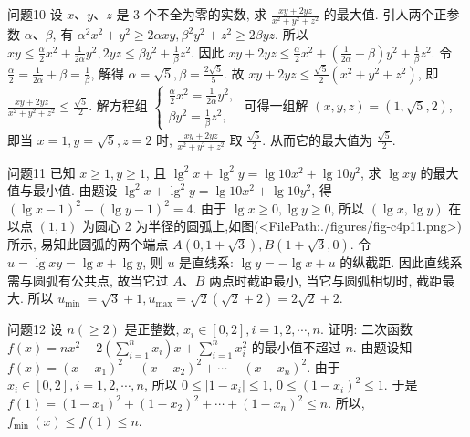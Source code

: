 问题10 设 $x 、 y 、 z$ 是 3 个不全为零的实数, 求 $\frac{x y+2 y z}{x^2+y^2+z^2}$ 的最大值.
引人两个正参数 $\alpha 、 \beta$, 有 $\alpha^2 x^2+y^2 \geqslant 2 \alpha x y, \beta^2 y^2+z^2 \geqslant 2 \beta y z$. 所以 $x y \leqslant \frac{\alpha}{2} x^2+\frac{1}{2 \alpha} y^2, 2 y z \leqslant \beta y^2+\frac{1}{\beta} z^2$. 因此 $x y+2 y z \leqslant \frac{\alpha}{2} x^2+\left(\frac{1}{2 \alpha}+\beta\right) y^2+ \frac{1}{\beta} z^2$. 令 $\frac{\alpha}{2}=\frac{1}{2 \alpha}+\beta=\frac{1}{\beta}$, 解得 $\alpha=\sqrt{5}, \beta=\frac{2 \sqrt{5}}{5}$. 故 $x y+2 y z \leqslant \frac{\sqrt{5}}{2}\left(x^2+\right. \left.y^2+z^2\right)$, 即 $\frac{x y+2 y z}{x^2+y^2+z^2} \leqslant \frac{\sqrt{5}}{2}$. 解方程组 $\left\{\begin{array}{l}\frac{\alpha}{2} x^2=\frac{1}{2 \alpha} y^2, \\ \beta y^2=\frac{1}{\beta} z^2,\end{array}\right.$ 可得一组解 $(x, y, z)=(1, \sqrt{5}, 2)$, 即当 $x=1, y=\sqrt{5}, z=2$ 时, $\frac{x y+2 y z}{x^2+y^2+z^2}$ 取 $\frac{\sqrt{5}}{2}$. 从而它的最大值为 $\frac{\sqrt{5}}{2}$.



问题11 已知 $x \geqslant 1, y \geqslant 1$, 且 $\lg ^2 x+\lg ^2 y=\lg 10 x^2+\lg 10 y^2$, 求 $\lg x y$ 的最大值与最小值.
由题设 $\lg ^2 x+\lg ^2 y=\lg 10 x^2+\lg 10 y^2$, 得 $(\lg x-1)^2+(\lg y-1)^2= 4$. 由于 $\lg x \geqslant 0, \lg y \geqslant 0$, 所以 $(\lg x, \lg y)$ 在以点 $(1,1)$ 为圆心 2 为半径的圆弧上,如图(<FilePath:./figures/fig-c4p11.png>)所示, 易知此圆弧的两个端点 $A(0,1+\sqrt{3}), B(1+\sqrt{3}, 0)$. 令 $u=\lg x y=\lg x+\lg y$, 则 $u$ 是直线系: $\lg y=-\lg x+u$ 的纵截距.
因此直线系需与圆弧有公共点, 故当它过 $A 、 B$ 两点时截距最小, 当它与圆弧相切时, 截距最大.
所以 $u_{\text {min }}= \sqrt{3}+1, u_{\max }=\sqrt{2}(\sqrt{2}+2)=2 \sqrt{2}+2$.



问题12 设 $n(\geqslant 2)$ 是正整数, $x_i \in[0,2], i=1,2, \cdots, n$. 证明: 二次函数 $f(x)=n x^2-2\left(\sum_{i=1}^n x_i\right) x+\sum_{i=1}^n x_i^2$ 的最小值不超过 $n$.
由题设知 $f(x)=\left(x-x_1\right)^2+\left(x-x_2\right)^2+\cdots+\left(x-x_n\right)^2$. 由于 $x_i \in[0,2], i=1,2, \cdots, n$, 所以 $0 \leqslant\left|1-x_i\right| \leqslant 1$, $0 \leqslant\left(1-x_i\right)^2 \leqslant 1$. 于是 $f(1)=\left(1-x_1\right)^2+\left(1-x_2\right)^2+\cdots+\left(1-x_n\right)^2 \leqslant n$. 所以, $f_{\text {min }}(x) \leqslant f(1) \leqslant n$. 




